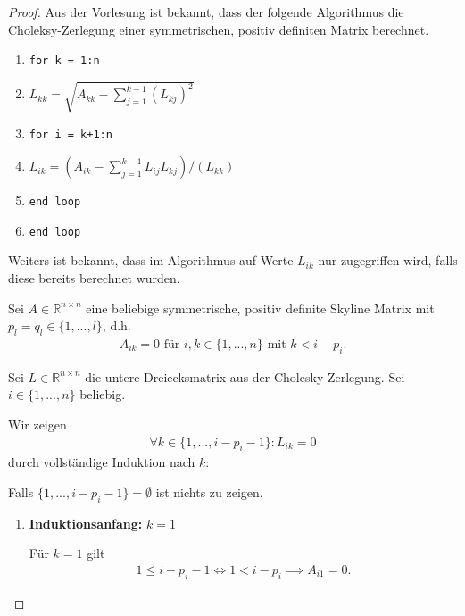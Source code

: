 \documentclass[titlepage]{article}
\begin{document}
\begin{proof}
	Aus der Vorlesung ist bekannt, dass der folgende Algorithmus die Choleksy-Zerlegung einer symmetrischen, positiv definiten Matrix berechnet.
	\begin{samepage}
	\begin{enumerate}[label={(\arabic*)}]
		\item \texttt{for k = 1:n}
		\item \hspace{5mm} $L_{kk} = \sqrt{A_{kk} - \sum_{j=1}^{k-1}(L_{kj})^2}$
		\item \hspace{5mm} \texttt{for i = k+1:n}
		\item \hspace{10mm} $L_{ik} = (A_{ik} - \sum_{j=1}^{k-1}L_{ij}L_{kj})/(L_{kk})$
		\item \hspace{5mm} \texttt{end loop}
		\item \texttt{end loop}
	\end{enumerate}
	\end{samepage}

	Weiters ist bekannt, dass im Algorithmus auf Werte $L_{ik}$ nur zugegriffen wird, falls diese bereits berechnet wurden.
	
	Sei $A \in \mathbb{R}^{n\times n}$ eine beliebige symmetrische, positiv definite Skyline Matrix mit $p_l = q_l \in \{1, ..., l\}$, d.h.
	\begin{align*}
		A_{ik} = 0 \text{ für } i,k \in \{1, ..., n\} \text{ mit } k < i - p_i.
	\end{align*}
	
	Sei $L \in \mathbb{R}^{n\times n}$ die untere Dreiecksmatrix aus der Cholesky-Zerlegung. Sei $i \in \{1, ..., n\}$ beliebig.
	
	Wir zeigen
	\begin{align}
		\forall k \in \{1, ..., i - p_i - 1\}: L_{ik} = 0
	\end{align}
	durch vollständige Induktion nach $k$:
	
	Falls $\{1, ..., i - p_i - 1\} = \emptyset$ ist nichts zu zeigen.
	
	\begin{enumerate}
		\item \textbf{Induktionsanfang:} $k=1$
		
		Für $k=1$ gilt
		\begin{align*}
			1 \leq i - p_i - 1 \iff 1 < i - p_i \implies A_{i1} = 0.
		\end{align*}
		

\end{enumerate}
\end{proof}
\end{document}
